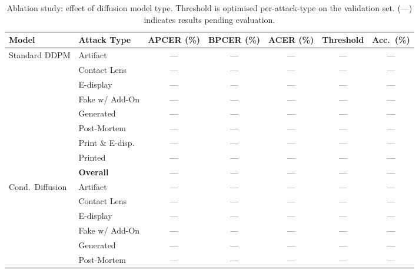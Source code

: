 %
%
\begin{table}[t]
  \centering
  \caption{Ablation study: effect of diffusion model type.
           Threshold is optimised per-attack-type on the validation set.
           (---) indicates results pending evaluation.}
  \label{tab:ablation_model}
  \begin{tabular}{llccccc}
    \toprule
    \textbf{Model} & \textbf{Attack Type}
      & \textbf{APCER (\%)} & \textbf{BPCER (\%)}
      & \textbf{ACER (\%)}  & \textbf{Threshold}
      & \textbf{Acc.\ (\%)} \\
    \midrule
    \multirow{9}{*}{Standard DDPM}
      & Artifact          & --- & --- & --- & --- & --- \\
      & Contact Lens      & --- & --- & --- & --- & --- \\
      & E-display         & --- & --- & --- & --- & --- \\
      & Fake w/ Add-On    & --- & --- & --- & --- & --- \\
      & Generated         & --- & --- & --- & --- & --- \\
      & Post-Mortem       & --- & --- & --- & --- & --- \\
      & Print \& E-disp.  & --- & --- & --- & --- & --- \\
      & Printed           & --- & --- & --- & --- & --- \\
      & \textbf{Overall}  & --- & --- & --- & --- & --- \\
    \midrule
    \multirow{9}{*}{Cond.\ Diffusion}
      & Artifact          & --- & --- & --- & --- & --- \\
      & Contact Lens      & --- & --- & --- & --- & --- \\
      & E-display         & --- & --- & --- & --- & --- \\
      & Fake w/ Add-On    & --- & --- & --- & --- & --- \\
      & Generated         & --- & --- & --- & --- & --- \\
      & Post-Mortem       & --- & --- & --- & --- & --- \\

\end{tabular}
\end{table}

